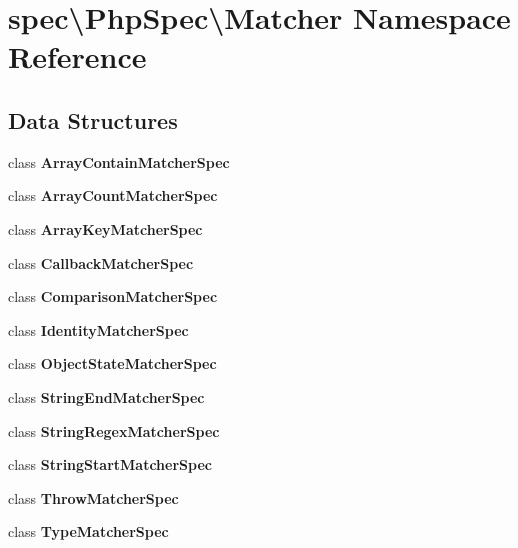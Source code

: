 \section{spec\textbackslash{}Php\+Spec\textbackslash{}Matcher Namespace Reference}
\label{namespacespec_1_1_php_spec_1_1_matcher}
\subsection*{Data Structures}
\begin{DoxyCompactItemize}
\item 
class {\bf Array\+Contain\+Matcher\+Spec}
\item 
class {\bf Array\+Count\+Matcher\+Spec}
\item 
class {\bf Array\+Key\+Matcher\+Spec}
\item 
class {\bf Callback\+Matcher\+Spec}
\item 
class {\bf Comparison\+Matcher\+Spec}
\item 
class {\bf Identity\+Matcher\+Spec}
\item 
class {\bf Object\+State\+Matcher\+Spec}
\item 
class {\bf String\+End\+Matcher\+Spec}
\item 
class {\bf String\+Regex\+Matcher\+Spec}
\item 
class {\bf String\+Start\+Matcher\+Spec}
\item 
class {\bf Throw\+Matcher\+Spec}
\item 
class {\bf Type\+Matcher\+Spec}
\end{DoxyCompactItemize}
